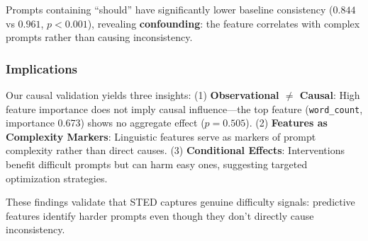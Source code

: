 Prompts containing ``should'' have significantly lower baseline consistency ($0.844$ vs $0.961$, $p<0.001$), revealing \textbf{confounding}: the feature correlates with complex prompts rather than causing inconsistency.

\subsubsection{Implications}

Our causal validation yields three insights: (1) \textbf{Observational $\neq$ Causal}: High feature importance does not imply causal influence---the top feature (\texttt{word\_count}, importance 0.673) shows no aggregate effect ($p=0.505$). (2) \textbf{Features as Complexity Markers}: Linguistic features serve as markers of prompt complexity rather than direct causes. (3) \textbf{Conditional Effects}: Interventions benefit difficult prompts but can harm easy ones, suggesting targeted optimization strategies.

These findings validate that STED captures genuine difficulty signals: predictive features identify harder prompts even though they don't directly cause inconsistency.
